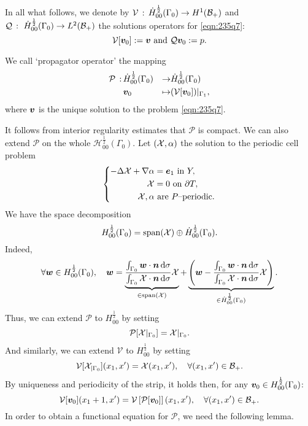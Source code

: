 \documentclass[a4paper,10pt,reqno]{amsart}
\begin{document}
In all what follows, we denote by $\mathcal{V}\,:\,\dot{H}^{\frac{1}{2}}_{00}(\Gamma_0)\to H^{1}(\mathcal{B}_+)$ and
$\mathcal{Q}\,:\ \dot{H}^{\frac{1}{2}}_{00}(\Gamma_0)\to L^{2}(\mathcal{B}_+)$ the solutions
operators for \cref{eqn:235q7}: 
\[
    \mathcal{V}[{\bm v}_0]:={\bm v} \text{ and }\mathcal{Q}{\bm v}_0:=p.
\] 
\begin{definition}
    We call `propagator operator' the mapping   
    \begin{equation}
    \label{eqn:6gnkg}   
    \begin{aligned}
        \mathcal{P}\,:\,& \dot{H}^{\frac{1}{2}}_{00}(\Gamma_0)&  \to & \dot{H}^{\frac{1}{2}}_{00}(\Gamma_0) \\  
        & {\bm v}_0 &  \mapsto & (\mathcal{V}[{\bm v}_0])|_{\Gamma_1},
    \end{aligned}
    \end{equation}
    where ${\bm v}$ is the unique solution to the problem \cref{eqn:235q7}.
\end{definition}
It follows from interior regularity estimates that $\mathcal{P}$ is compact. We can
also extend $\mathcal{P}$ on the whole $\mathcal{H}_{00}^{\frac{1}{2}}(\Gamma_0)$.
Let $(\mathcal{X},\alpha)$ the solution to the periodic cell problem   
\[
\left\{\begin{aligned}
        -\Delta \mathcal{X}+\nabla\alpha &=  {\bm e}_1 \textrm{ in } Y,\\ 
        \mathcal{X} &= 0\textrm{ on } \partial T,\\  
        \mathcal{X},\alpha &\text{ are $P$--periodic}.
\end{aligned}
\right.
\] 
We have the space decomposition     
\[
    H_{00}^{\frac{1}{2}}(\Gamma_0) = \mathrm{span}(\mathcal{X})\oplus \dot{H}^{\frac{1}{2}}_{00}(\Gamma_0).
\] 
Indeed,     
\[
\forall {\bm w}\in H_{00}^{\frac{1}{2}}(\Gamma_0),\quad
{\bm w}=\underbrace{\frac{\int_{\Gamma_0}{\bm w}\cdot{\bm n}\,\mathrm{d}\sigma}{\int_{\Gamma_0}\mathcal{X}\cdot{\bm n}\,\mathrm{d}
\sigma} \mathcal{X}}_{\in \mathrm{span}(\mathcal{X})}
+\underbrace{\left( {\bm w}-\frac{\int_{\Gamma_0}{\bm w}\cdot{\bm n}\,\mathrm{d}\sigma}{\int_{\Gamma_0}\mathcal{X}\cdot{\bm n}\,\mathrm{d}
\sigma} \mathcal{X} \right)}_{\in \dot{H}^{\frac{1}{2}}_{00}(\Gamma_0)}.
\] 
Thus, we can extend $\mathcal{P}$ to $H^{\frac{1}{2}}_{00}$ by setting     
\[
    \mathcal{P}[\mathcal{X}|_{\Gamma_0}] = \mathcal{X}|_{\Gamma_0}.
\] 
And similarly, we can extend $\mathcal{V}$ to $H^{\frac{1}{2}}_{00}$ by setting     
\[
    \mathcal{V}[\mathcal{X}_{|\Gamma_0}](x_1,x')=\mathcal{X}(x_1,x'),\quad \forall (x_1,x')\in
    \mathcal{B}_+.
\] 
By uniqueness and periodicity of the strip, it holds then, for any ${\bm v}_0\in
H^{\frac{1}{2}}_{00}(\Gamma_0)$: 
\[
    \mathcal{V}[{\bm v}_0](x_1+1,x')=\mathcal{V}\left[\mathcal{P}[{\bm v}_0]\right](x_1,x'),\quad
    \forall (x_1,x')\in \mathcal{B}_+.
\] 
In order to obtain a functional equation for $\mathcal{P}$, we need the following
lemma.
\end{document}

